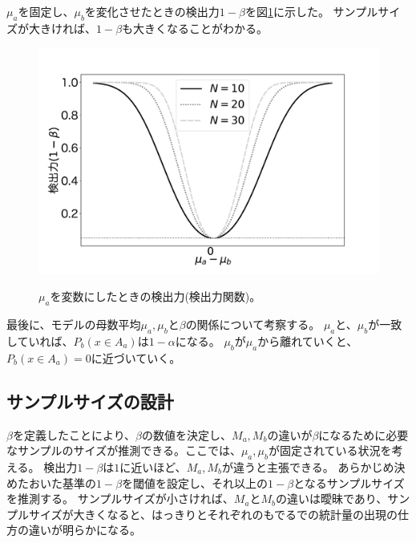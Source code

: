 $\mu_a$を固定し、$\mu_b$を変化させたときの検出力$1-\beta$を図\ref{fig:power_of_test_N_mu0_variable}に示した。
サンプルサイズが大きければ、$1-\beta$も大きくなることがわかる。

\begin{figure}
    \begin{center}
        \includegraphics[width=15cm]{./image/04_/power_of_test.pdf}
        \label{fig:power_of_test_N_mu0_variable}
        \caption{$\mu_a$を変数にしたときの検出力(検出力関数)。}
    \end{center}
\end{figure}



最後に、モデルの母数平均$\mu_a,\mu_b$と$\beta$の関係について考察する。
$\mu_a$と、$\mu_b$が一致していれば、$P_b(x \in A_a )$は$1-\alpha$になる。
$\mu_b$が$\mu_a$から離れていくと、$P_b(x \in A_a)=0$に近づいていく。


\subsection{サンプルサイズの設計}
$\beta$を定義したことにより、$\beta$の数値を決定し、$M_a,M_b$の違いが$\beta$になるために必要なサンプルのサイズが推測できる。ここでは、$\mu_a,\mu_b$が固定されている状況を考える。
検出力$1-\beta$は$1$に近いほど、$M_a,M_b$が違うと主張できる。
あらかじめ決めたおいた基準の$1-\beta$を閾値を設定し、それ以上の$1-\beta$となるサンプルサイズを推測する。
サンプルサイズが小さければ、$M_a$と$M_b$の違いは曖昧であり、サンプルサイズが大きくなると、はっきりとそれぞれのもでるでの統計量の出現の仕方の違いが明らかになる。




